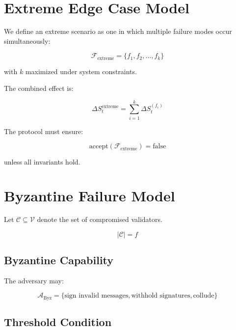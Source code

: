 \section{Extreme Edge Case Model}

We define an extreme scenario as one in which multiple failure modes occur simultaneously:

\begin{equation}
\mathcal{F}_{\text{extreme}} = \{f_1, f_2, \dots, f_k\}
\end{equation}

with $k$ maximized under system constraints.

The combined effect is:

\begin{equation}
\Delta S_t^{\text{extreme}} = \sum_{i=1}^{k} \Delta S_t^{(f_i)}
\end{equation}

The protocol must ensure:

\begin{equation}
\text{accept}(\mathcal{F}_{\text{extreme}}) = \text{false}
\end{equation}

unless all invariants hold.

\section{Byzantine Failure Model}

Let $\mathcal{C} \subseteq \mathcal{V}$ denote the set of compromised validators.

\begin{equation}
|\mathcal{C}| = f
\end{equation}

\subsection{Byzantine Capability}

The adversary may:

\begin{equation}
\mathcal{A}_{\text{Byz}} = \{\text{sign invalid messages}, \text{withhold signatures}, \text{collude}\}
\end{equation}

\subsection{Threshold Condition}

